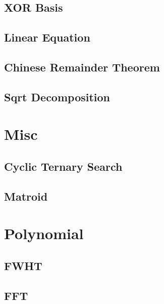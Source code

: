 \documentclass[a4paper,10pt,oneside]{article}
\begin{document}
\subsection{XOR Basis}


\subsection{Linear Equation}


\subsection{Chinese Remainder Theorem}


\subsection{Sqrt Decomposition}


\section{Misc}

%

\subsection{Cyclic Ternary Search}


\subsection{Matroid}


\section{Polynomial}

\subsection{FWHT}


\subsection{FFT}

\end{document}
